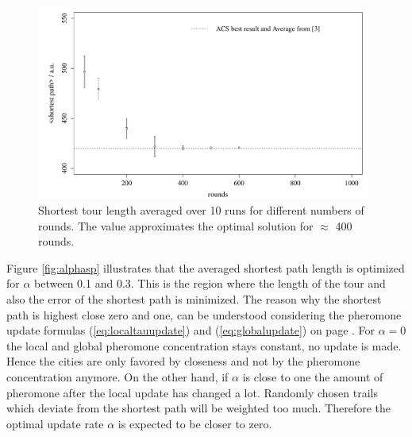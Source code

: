 \begin{figure}[h!]
\begin{center}
\includegraphics[width=11cm, height= 6 cm]{rounds_vs_shortestpath_oli}
\caption{Shortest tour length averaged over 10 runs for different numbers of rounds. The value approximates the optimal solution for $\approx$ 400 rounds.}
\label{fig:roundspoli}
\end{center}
\end{figure}


Figure \ref{fig:alphasp} illustrates that the averaged shortest path length is optimized for $\alpha$ between 0.1 and 0.3. This is the region where the length of the tour and also the error of the shortest path is minimized. The reason why the shortest path is highest close zero and one, can be understood considering the pheromone update formulas (\ref{eq:localtauupdate}) and (\ref{eq:globalupdate}) on page \pageref{sec:model}. For $\alpha=0$ the local and global pheromone concentration stays constant, no update is made. Hence the cities are only favored by closeness and not by the pheromone concentration anymore. On the other hand, if $\alpha$ is close to one the amount of pheromone after the local update has changed a lot. Randomly chosen trails which deviate from the shortest path will be weighted too much. Therefore the optimal update rate $\alpha$ is expected to be closer to zero. 


